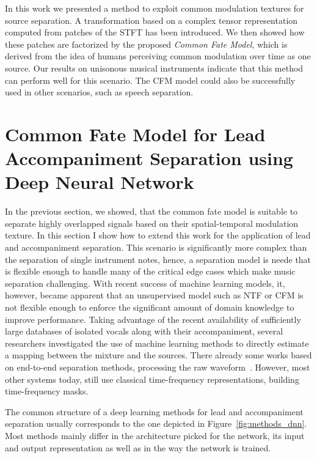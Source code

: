 {{%
In this work we presented a method to exploit common modulation textures for source separation. A transformation based on a complex tensor representation computed from patches of the STFT has been introduced. We then showed how these patches are factorized by the proposed \emph{Common Fate Model}, which is derived from the idea of humans perceiving common modulation over time as one source. Our results on unisonous musical instruments indicate that this method can perform well for this scenario. The CFM model could also be successfully used in other scenarios, such as speech separation.

\section{Common Fate Model for Lead Accompaniment Separation using Deep Neural Network}


In the previous section, we showed, that the common fate model is suitable to separate highly overlapped signals based on their spatial-temporal modulation texture.
In this section I show how to extend this work for the application of lead  and accompaniment separation.
This scenario is significantly more complex than the separation of single instrument notes, hence, a separation model is neede that is flexible enough to handle many of the critical edge cases which make music separation challenging.
With recent success of machine learning models, it, however, became apparent that an unsupervised model such as NTF or CFM is not flexible enough to enforce the significant amount of domain knowledge to improve performance.
Taking advantage of the recent availability of sufficiently large databases of isolated vocals along with their accompaniment, several researchers investigated the use of machine learning methods to directly estimate a mapping between the mixture and the sources.
There already some works based on end-to-end separation methods, processing the raw waveform~\cite{venkataramani17}.
However, most other systems today, still use classical time-frequency representations, building time-frequency masks.
\par
The common structure of a deep learning methods for lead and accompaniment separation usually corresponds to the one depicted in Figure~\ref{fig:methods_dnn}.
Most methods mainly differ in the architecture picked for the network, its input and output representation as well as in the way the network is trained.

}}
